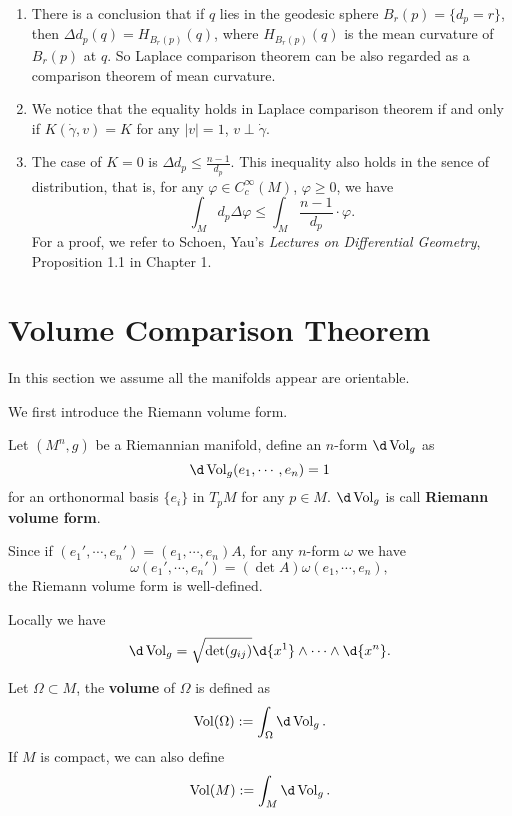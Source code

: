\begin{rem}
    \begin{enumerate}[(1)]
        \item There is a conclusion that if $q$ lies in the geodesic sphere $B_r(p)=\{d_p=r\}$, then $\Delta d_p(q)=H_{B_r(p)}(q)$, where $H_{B_r(p)}(q)$ is the mean curvature of $B_r(p)$ at $q$.
        So Laplace comparison theorem can be also regarded as a comparison theorem of mean curvature.
        \item We notice that the equality holds in Laplace comparison theorem if and only if $K(\dot{\gamma},v)=K$ for any $|v|=1$, $v\perp\dot{\gamma}$.
        \item The case of $K=0$ is $\Delta d_p\leq\frac{n-1}{d_p}$.
        This inequality also holds in the sence of distribution, that is, for any $\varphi\in C^\infty_c(M)$, $\varphi\geq 0$, we have
        \[\int_Md_p\Delta\varphi\leq\int_M\frac{n-1}{d_p}\cdot\varphi.\]
        For a proof, we refer to Schoen, Yau's \emph{Lectures on Differential Geometry}, Proposition 1.1 in Chapter 1.
    \end{enumerate}
\end{rem}

\section{Volume Comparison Theorem}
In this section we assume all the manifolds appear are orientable.

We first introduce the Riemann volume form.
\begin{defn}
    Let $(M^n,g)$ be a Riemannian manifold, define an $n$-form $\d\Vol_g$ as 
    \[\d\Vol_g(e_1,\cdots,e_n)=1\]
    for an orthonormal basis $\{e_i\}$ in $T_pM$ for any $p\in M$.
    $\d\Vol_g$ is call \textbf{Riemann volume form}.
\end{defn}

Since if $(e_1',\cdots,e_n')=(e_1,\cdots,e_n)A$, for any $n$-form $\omega$ we have
\[\omega(e_1',\cdots,e_n')=(\det{A})\omega(e_1,\cdots,e_n),\]
the Riemann volume form is well-defined.

Locally we have
\[\d\Vol_g=\sqrt{\det(g_{ij})}\d{x^1}\wedge\cdots\wedge\d{x^n}.\]

\begin{defn}
    Let $\Omega\subset M$, the \textbf{volume} of $\Omega$ is defined as
    \[\Vol(\Omega):=\int_\Omega\d\Vol_g.\]
    If $M$ is compact, we can also define
    \[\Vol(M):=\int_M\d\Vol_g.\]
\end{defn}

